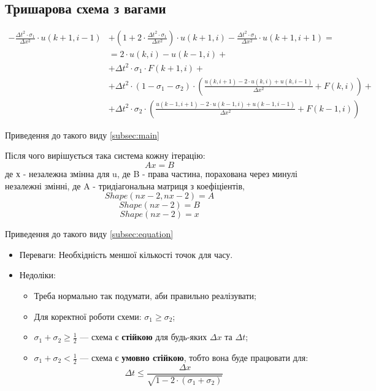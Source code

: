 \documentclass{article}
\begin{document}
        \subsection{Тришарова схема з вагами}
            \label{enum:main}
            \begin{align*}
                - \frac{\Delta{t}^2 \cdot \sigma_1}{\Delta{x}^2} \cdot u(k+1, i-1) & + \left( 1 + 2 \cdot \frac{\Delta{t}^2 \cdot \sigma_1}{\Delta{x}^2} \right) \cdot u(k+1, i) - \frac{\Delta{t}^2 \cdot \sigma_1}{\Delta{x}^2} \cdot u(k+1, i+1) = \\
                & = 2 \cdot u(k, i) - u(k-1, i)  + \\
                & + \Delta{t}^2 \cdot \sigma_1 \cdot F(k+1, i) + \\
                & + \Delta{t}^2 \cdot \left(1 - \sigma_1 - \sigma_2 \right) \cdot \left(\frac{u(k, i+1) - 2 \cdot u(k, i) + u(k, i-1)}{\Delta{x}^2} + F(k, i)\right) + \\
                & + \Delta{t}^2 \cdot \sigma_2 \cdot \left(\frac{u(k-1, i+1) - 2 \cdot u(k-1, i) + u(k-1, i-1)}{\Delta{x}^2} + F(k-1, i)\right)
            \end{align*}

            Приведення до такого виду \eqref{subsec:main}

            Після чого вирішується така система кожну ітерацію:
            $$ Ax = B $$ де х - незалежна змінна для u, де B - права частина, порахована через минулі незалежні змінні, де A - тридіагональна матриця з коефіціентів,  
            $$ Shape (nx - 2, nx - 2) = A$$ 
            $$ Shape (nx - 2) = B$$
            $$ Shape (nx - 2) = x$$

            Приведення до такого виду \eqref{subsec:equation}

            \begin{itemize}
                \item Переваги: Необхідність меншої кількості точок для часу.
                \item Недоліки\label{itemz:main}:
                    \begin{itemize}
                        \item Треба нормально так подумати, аби правильно реалізувати;
                        \item Для коректної роботи схеми: $ \sigma_1 \geq \sigma_2 $;
                        \item $ \sigma_1 + \sigma_2 \geq \frac{1}{2} $ --- схема є \textbf{стійкою} для будь-яких $ \Delta{x} $ та $ \Delta{t} $;
                        \item $ \sigma_1 + \sigma_2 < \frac{1}{2} $ --- схема є \textbf{умовно стійкою}, тобто вона буде працювати для:
                        $$ \Delta{t} \leq \frac{\Delta{x}}{\sqrt{1 - 2 \cdot(\sigma_1 + \sigma_2)}} $$
                \end{itemize}
            \end{itemize}
\end{document}
